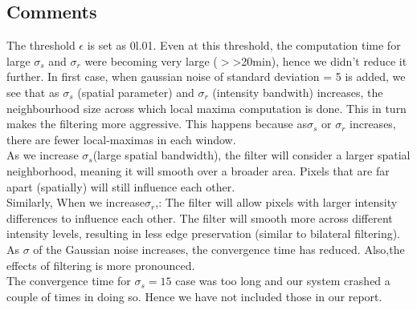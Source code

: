 \documentclass{article}
\begin{document}
\subsection{Comments}
The threshold $\epsilon$ is set as 0l.01. Even at this threshold, the computation time for large $\sigma_{s}$ and $\sigma_{r}$ were becoming very large ($>$>20min), hence we didn't reduce it further.
In first case, when gaussian noise of standard deviation = 5 is added, we  see that as $\sigma _{s}$ (spatial parameter) and $\sigma_{r}$ (intensity bandwith) increases, the neighbourhood size across which local maxima computation is done. This in turn makes the filtering more aggressive. This happens because as$\sigma _{s}$ or $\sigma _{r}$ increases, there are fewer local-maximas in each window.\\
As we increase $\sigma_{s}$(large spatial bandwidth), the filter will consider a larger spatial neighborhood, meaning it will smooth over a broader area. Pixels that are far apart (spatially) will still influence each other.\\
Similarly, When we increase$\sigma_{r}$,: The filter will allow pixels with larger intensity differences to influence each other. The filter will smooth more across different intensity levels, resulting in less edge preservation (similar to bilateral filtering).
As $\sigma$ of the Gaussian noise increases, the convergence time has reduced. Also,the effects of filtering is more pronounced. \\
The convergence time for $\sigma_{s}=15$ case was too long and our system crashed a couple of times in doing so. Hence we have not included those in our report.
\end{document}
